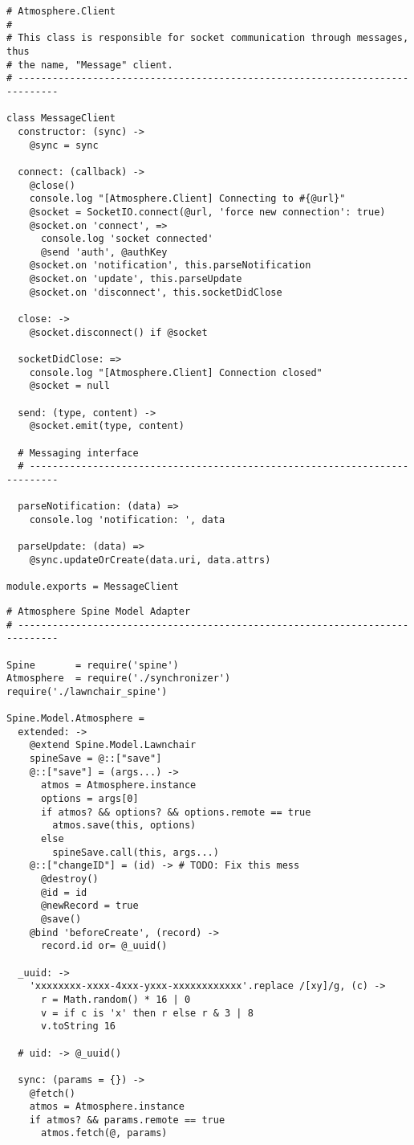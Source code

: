 \begin{lstlisting}[caption=message\_client.coffee]
# Atmosphere.Client
#
# This class is responsible for socket communication through messages, thus
# the name, "Message" client.
# -----------------------------------------------------------------------------

class MessageClient
  constructor: (sync) ->
    @sync = sync

  connect: (callback) ->
    @close()
    console.log "[Atmosphere.Client] Connecting to #{@url}"
    @socket = SocketIO.connect(@url, 'force new connection': true)
    @socket.on 'connect', =>
      console.log 'socket connected'
      @send 'auth', @authKey
    @socket.on 'notification', this.parseNotification
    @socket.on 'update', this.parseUpdate
    @socket.on 'disconnect', this.socketDidClose

  close: ->
    @socket.disconnect() if @socket

  socketDidClose: =>
    console.log "[Atmosphere.Client] Connection closed"
    @socket = null

  send: (type, content) ->
    @socket.emit(type, content)
  
  # Messaging interface
  # ---------------------------------------------------------------------------

  parseNotification: (data) =>
    console.log 'notification: ', data
  
  parseUpdate: (data) =>
    @sync.updateOrCreate(data.uri, data.attrs)

module.exports = MessageClient
\end{lstlisting}

\begin{lstlisting}[caption=spine.coffee]
# Atmosphere Spine Model Adapter
# -----------------------------------------------------------------------------

Spine       = require('spine')
Atmosphere  = require('./synchronizer')
require('./lawnchair_spine')

Spine.Model.Atmosphere =
  extended: ->
    @extend Spine.Model.Lawnchair
    spineSave = @::["save"]
    @::["save"] = (args...) ->
      atmos = Atmosphere.instance
      options = args[0]
      if atmos? && options? && options.remote == true
        atmos.save(this, options)
      else
        spineSave.call(this, args...)
    @::["changeID"] = (id) -> # TODO: Fix this mess
      @destroy()
      @id = id
      @newRecord = true
      @save()
    @bind 'beforeCreate', (record) ->
      record.id or= @_uuid()

  _uuid: ->
    'xxxxxxxx-xxxx-4xxx-yxxx-xxxxxxxxxxxx'.replace /[xy]/g, (c) ->
      r = Math.random() * 16 | 0
      v = if c is 'x' then r else r & 3 | 8
      v.toString 16
  
  # uid: -> @_uuid()

  sync: (params = {}) ->
    @fetch()
    atmos = Atmosphere.instance
    if atmos? && params.remote == true
      atmos.fetch(@, params)


\end{lstlisting}

